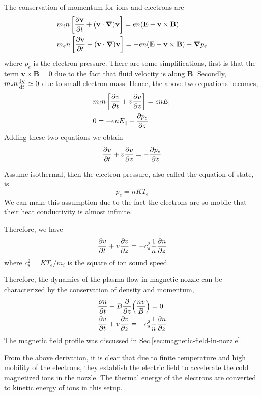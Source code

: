 The conservation of momentum for ions and electrons are
\begin{align}
	 & m_in\left[\pdv{\mathbf{v}}{t} + (\mathbf{v}\cdot\grad)\mathbf{v}\right] = en(\mathbf{E}+\mathbf{v}\times\mathbf{B})                \\
	 & m_en\left[\pdv{\mathbf{v}}{t} + (\mathbf{v}\cdot\grad)\mathbf{v}\right]  = -en(\mathbf{E}+\mathbf{v}\times\mathbf{B}) - \grad{p_e}
\end{align}
where $p_e$ is the electron pressure. There are some simplifications, first is that the term $\mathbf{v\times B} = 0$ due to the fact that fluid velocity is along $\mathbf{B}$. Secondly, $m_en\dv{\mathbf{v}}{t} \simeq 0$ due to small electron mass. Hence, the above two equations becomes,
\begin{align}
	 & m_in\left[\pdv{v}{t} + v\pdv{v}{z}\right] = enE_\parallel \\
	 & 0 = -enE_\parallel - \pdv{p_e}{z}
\end{align}
Adding these two equations we obtain
\begin{equation}
	\pdv{v}{t} + v\pdv{v}{z} = -\pdv{p_e}{z}
\end{equation}

Assume isothermal, then the electron pressure, also called the equation of state, is
\begin{equation} \label{eq:eos}
	p_e = nKT_e
\end{equation}
We can make this assumption due to the fact the electrons are so mobile that their heat conductivity is almost infinite. \cite{chen_introduction_2016}

Therefore, we have
\begin{equation}
	\pdv{v}{t} + v\pdv{v}{z} = -c_s^2\frac{1}{n}\pdv{n}{z}
\end{equation}
where $c_s^2 = KT_e/m_i$ is the square of ion sound speed.

Therefore, the dynamics of the plasma flow in magnetic nozzle can be characterized by the conservation of density and momentum,
\begin{align*}
	 & \pdv{n}{t} + B\pdv{z}(\frac{nv}{B}) = 0                \\
	 & \pdv{v}{t} + v\pdv{v}{z} = -c_s^2\frac{1}{n}\pdv{n}{z}
\end{align*}
The magnetic field profile was discussed in Sec.\ref{sec:magnetic-field-in-nozzle}.

From the above derivation, it is clear that due to finite temperature and high mobility of the electrons, they establish the electric field to accelerate the cold magnetized ions in the nozzle. The thermal energy of the electrons are converted to kinetic energy of ions in this setup.

